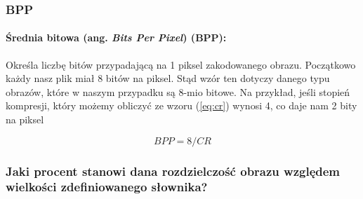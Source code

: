 \documentclass{article}
\begin{document}
\subsubsection{BPP}

\paragraph{Średnia bitowa (ang. \emph{Bits Per Pixel}) (BPP):}
Określa liczbę bitów przypadającą na 1 piksel zakodowanego obrazu. Początkowo każdy nasz plik miał 8 bitów na piksel. Stąd wzór ten dotyczy danego typu obrazów, które w naszym przypadku są 8-mio bitowe. Na przykład, jeśli stopień kompresji, który możemy obliczyć ze wzoru (\ref{eq:cr}) wynosi 4, co daje nam 2 bity na piksel 

\begin{equation}
BPP = 8 / CR
\end{equation}


\subsubsection{Jaki procent stanowi dana rozdzielczość 
obrazu względem wielkości zdefiniowanego słownika?}
\end{document}
